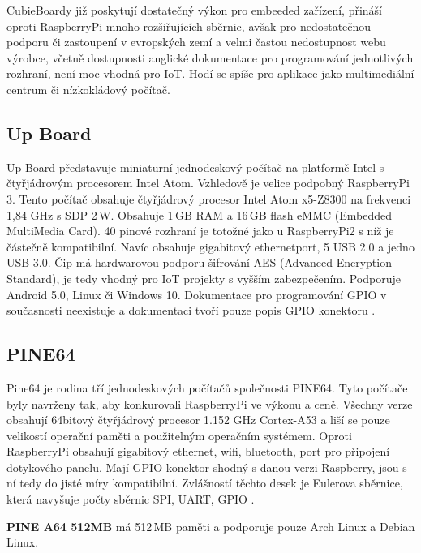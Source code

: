 CubieBoardy již poskytují dostatečný výkon pro embeeded zařízení, přináší oproti RaspberryPi mnoho rozšiřujících sběrnic, avšak pro nedostatečnou podporu či zastoupení v evropských zemí a velmi častou nedostupnost webu výrobce, včetně dostupnosti anglické dokumentace pro  programování jednotlivých rozhraní, není moc vhodná pro IoT. Hodí se spíše pro aplikace jako multimediální centrum či nízkokládový počítač. 	


\subsection{Up Board}
		Up Board představuje miniaturní jednodeskový počítač na platformě Intel s čtyřjádrovým procesorem Intel Atom. Vzhledově je velice podpobný RaspberryPi 3. 
		Tento počítač obsahuje čtyřjádrový procesor Intel Atom x5-Z8300 na frekvenci 1,84 GHz s SDP 2\,W. Obsahuje 1\,GB RAM a 16\,GB flash eMMC (Embedded MultiMedia Card). 40 pinové rozhraní je totožné jako u RaspberryPi2 s níž je částečně kompatibilní. Navíc obsahuje gigabitový ethernetport, 5 USB 2.0 a jedno USB 3.0. Čip má hardwarovou podporu šifrování AES (Advanced Encryption Standard), je tedy vhodný pro IoT projekty s vyšším zabezpečením. Podporuje Android 5.0, Linux či Windows 10. Dokumentace pro programování GPIO v současnosti neexistuje a dokumentaci tvoří pouze popis GPIO konektoru \cite{UpBoard}.

	\subsection{PINE64}
Pine64 je rodina tří jednodeskových počítačů společnosti PINE64. Tyto počítače byly navrženy tak, aby konkurovali RaspberryPi ve výkonu a ceně. Všechny verze obsahují 64bitový čtyřjádrový procesor 1.152 GHz Cortex-A53 a liší se pouze velikostí operační paměti a použitelným operačním systémem. Oproti RaspberryPi obsahují gigabitový ethernet, wifi, bluetooth, port pro připojení dotykového panelu. Mají GPIO konektor shodný s danou verzi Raspberry, jsou s ní tedy do jisté míry kompatibilní. Zvlášností těchto desek je Eulerova sběrnice, která navyšuje počty sběrnic SPI, UART, GPIO \cite{Pine64}.

\textbf{PINE A64 512MB} má 512\,MB paměti a podporuje pouze Arch Linux a Debian Linux.

